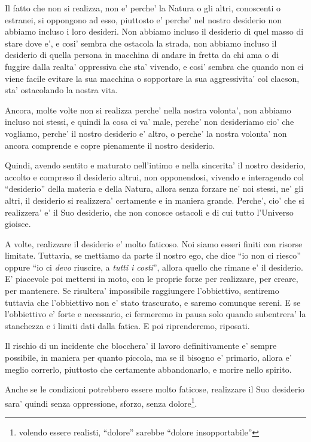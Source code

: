Il fatto che non si realizza, non e' perche' la Natura o gli altri, conoscenti o estranei, si oppongono ad esso, piuttosto e' perche' nel nostro desiderio non abbiamo incluso i loro desideri. Non abbiamo incluso il desiderio di quel masso di stare dove e', e cosi' sembra che ostacola la strada, non abbiamo incluso il desiderio di quella persona in macchina di andare in fretta da chi ama o di fuggire dalla realta' oppressiva che sta' vivendo, e cosi' sembra che quando non ci viene facile evitare la sua macchina o sopportare la sua aggressivita' col clacson, sta' ostacolando la nostra vita.

Ancora, molte volte non si realizza perche' nella nostra volonta', non abbiamo incluso noi stessi, e quindi la cosa ci va' male, perche' non desideriamo cio' che vogliamo, perche' il nostro desiderio e' altro, o perche' la nostra volonta' non ancora comprende e copre pienamente il nostro desiderio.

Quindi, avendo sentito e maturato nell'intimo e nella sincerita' il nostro desiderio, accolto e compreso il desiderio altrui, non opponendosi, vivendo e interagendo col ``desiderio'' della materia e della Natura, allora senza forzare ne' noi stessi, ne' gli altri, il desiderio si realizzera' certamente e in maniera grande. Perche', cio' che si realizzera' e' il Suo desiderio, che non conosce ostacoli e di cui tutto l'Universo gioisce. 

A volte, realizzare il desiderio e' molto faticoso. Noi siamo esseri finiti con risorse limitate. Tuttavia, se mettiamo da parte il nostro ego, che dice ``io non ci riesco'' oppure ``io ci \emph{devo} riuscire, a \emph{tutti i costi}'', allora quello che rimane e' il desiderio. E' piacevole poi mettersi in moto, con le proprie forze per realizzare, per creare, per mantenere. Se risultera' impossibile raggiungere l'obbiettivo, sentiremo tuttavia che l'obbiettivo non e' stato trascurato, e saremo comunque sereni. E se l'obbiettivo e' forte e necessario, ci fermeremo in pausa solo quando subentrera' la stanchezza e i limiti dati dalla fatica. E poi riprenderemo, riposati.

Il rischio di un incidente che blocchera' il lavoro definitivamente e' sempre possibile, in maniera per quanto piccola, ma se il bisogno e' primario, allora e' meglio correrlo, piuttosto che certamente abbandonarlo, e morire nello spirito.

Anche se le condizioni potrebbero essere molto faticose, realizzare il Suo desiderio sara' quindi senza oppressione, sforzo, senza dolore\footnote{volendo essere realisti, ``dolore'' sarebbe ``dolore insopportabile''}.


